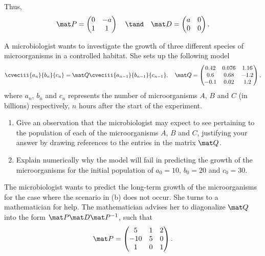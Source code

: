 \begin{solution}
\begin{ppart}
\begin{psubpart}
            Thus, \[\mat P = \begin{pmatrix}0 & -a \\ 1 & 1\end{pmatrix} \quad \tand \quad \mat D = \begin{pmatrix}a & 0 \\ 0 & 0\end{pmatrix}.\]
        \end{psubpart}
    \end{ppart}
\end{solution}

\begin{problem}
    A microbiologist wants to investigate the growth of three different species of microorganisms in a controlled habitat. She sets up the following model \[\cveciii{a_n}{b_n}{c_n} = \mat Q\cveciii{a_{n-1}}{b_{n-1}}{c_{n-1}}, \quad \mat Q = \begin{pmatrix}0.42 & 0.076 & 1.16 \\ 0.6 & 0.68 & -1.2 \\ -0.1 & 0.02 & 1.2\end{pmatrix},\] where $a_n$, $b_n$ and $c_n$ represents the number of microorganisms $A$, $B$ and $C$ (in billions) respectively, $n$ hours after the start of the experiment.

    \begin{enumerate}
        \item Give an observation that the microbiologist may expect to see pertaining to the population of each of the microorganisms $A$, $B$ and $C$, justifying your answer by drawing references to the entries in the matrix $\mat Q$.
        \item Explain numerically why the model will fail in predicting the growth of the microorganisms for the initial population of $a_0 = 10$, $b_0 = 20$ and $c_0 = 30$.
    \end{enumerate}

    The microbiologist wants to predict the long-term growth of the microorganisms for the case where the scenario in (b) does not occur. She turns to a mathematician for help. The mathematician advises her to diagonalize $\mat Q$ into the form $\mat P \mat D \mat P^{-1}$, such that \[\mat P = \begin{pmatrix}5 & 1 & 2 \\ -10 & 5 & 0 \\ 1 & 0 & 1\end{pmatrix}.\]


\end{problem}

